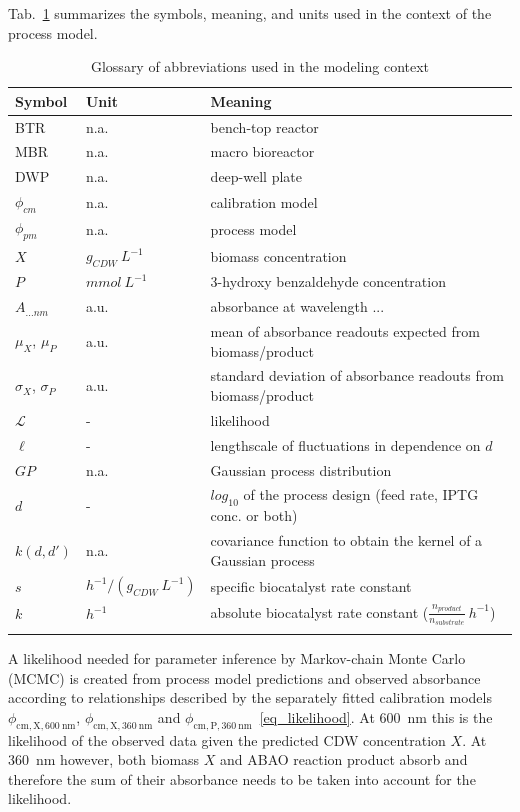 \documentclass[sn-standardnature]{sn-jnl}%
\theoremstyle{thmstyleone}%
\theoremstyle{thmstyletwo}%
\theoremstyle{thmstylethree}%
\begin{document}
Tab.~\ref{tab_abbreviations} summarizes the symbols, meaning, and units used in the context of the process model.


\begin{table}[h]
    \begin{center}
    \begin{minipage}{\textwidth}
    \caption{Glossary of abbreviations used in the modeling context}
    \label{tab_abbreviations}
    \begin{tabular}{@{}lll@{}}
\toprule
Symbol & Unit  & Meaning\\
\midrule
BTR & n.a. & bench-top reactor\\
MBR & n.a. & macro bioreactor\\
DWP & n.a. & deep-well plate\\
$\phi_{cm}$ & n.a. & calibration model\\
$\phi_{pm}$ & n.a. & process model\\
$X$ & $g_{CDW}\ L^{-1}$ & biomass concentration\\
$P$ & $mmol\ L^{-1}$ & 3-hydroxy benzaldehyde concentration\\
$A_{... nm}$ & a.u. & absorbance at wavelength ...\\
$\mu_X$, $\mu_P$ & a.u. & mean of absorbance readouts expected from biomass/product\\
$\sigma_X$, $\sigma_P$ & a.u. & standard deviation of absorbance readouts from biomass/product\\
$\mathcal{L}$ & - & likelihood\\
$\ell$ & - & lengthscale of fluctuations in dependence on $d$\\
$GP$ & n.a. & Gaussian process distribution\\
$d$ & - & $log_{10}$ of the process design (feed rate, IPTG conc. or both)\\
$k(d, d')$ & n.a. & covariance function to obtain the kernel of a Gaussian process\\
$s$ & $h^{-1}/(g_{CDW}\ L^{-1})$ & specific biocatalyst rate constant\\
$k$ & $h^{-1}$ & absolute biocatalyst rate constant ($\frac{n_{product}}{n_{substrate}}\ h^{-1}$)\\
\botrule
    \end{tabular}
    \end{minipage}
    \end{center}
\end{table}

A likelihood needed for parameter inference by Markov-chain Monte Carlo (MCMC) is created from process model predictions and observed absorbance according to relationships described by the separately fitted calibration models $\phi_\mathrm{cm,X,600\ nm}$, $\phi_\mathrm{cm,X,360\ nm}$ and $\phi_\mathrm{cm,P,360\ nm}$~\eqref{eq_likelihood}.
At 600~nm this is the likelihood of the observed data given the predicted CDW concentration $X$.
At 360~nm however, both biomass $X$ and ABAO reaction product absorb and therefore the sum of their absorbance needs to be taken into account for the likelihood.
\end{document}
